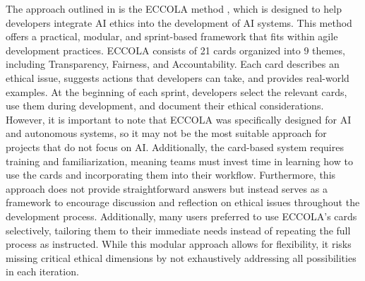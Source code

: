 The approach outlined in \cite{halme2021write} is the ECCOLA method \cite{VAKKURI2021111067}, which is designed to help developers integrate AI ethics into the development of AI systems. This method offers a practical, 
modular, and sprint-based framework that fits within agile development practices. ECCOLA consists of 21 cards organized into 9 themes, including Transparency, Fairness, and Accountability. 
Each card describes an ethical issue, suggests actions that developers can take, and provides real-world examples. 
At the beginning of each sprint, developers select the relevant cards, use them during development, and document their ethical considerations. However, it is important to note that ECCOLA was 
specifically designed for AI and autonomous systems, so it may not be the most suitable approach for projects that do not focus on AI. Additionally, the card-based system requires training and 
familiarization, meaning teams must invest time in learning how to use the cards and incorporating them into their workflow.
Furthermore, this approach does not provide straightforward answers but instead serves as a framework to encourage discussion and reflection on ethical issues throughout the development process.
Additionally, many users preferred to use ECCOLA's cards selectively, tailoring them to their immediate needs instead of repeating the full process as instructed. 
While this modular approach allows for flexibility, it risks missing critical ethical dimensions by not exhaustively addressing all possibilities in each iteration.


